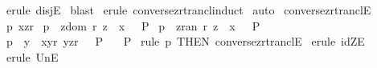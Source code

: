 \begin{isabellebody}
\ {\isacharparenleft}erule\ disjE{\isacharparenright}\isanewline
{}\isamarkupfalse%
\ blast{\isacharplus}\isanewline
{}\isamarkupfalse%
\ {\isacharparenleft}erule\ converse{\isacharunderscore}zrtrancl{\isacharunderscore}induct{\isacharparenright}\isanewline
{}\isamarkupfalse%
\ {\isacharparenleft}auto{\isacharparenright}\isanewline
{}\isamarkupfalse%
%
\endisatagproof
{\isafoldproof}%
%
\isadelimproof
\isanewline
%
\endisadelimproof
\isanewline
{}\isamarkupfalse%
\ converse{\isacharunderscore}zrtranclE{\isacharcolon}\isanewline
{}\ p{}{\isacharcolon}\ {\isachardoublequoteopen}{\isacharparenleft}x{\isacharcomma}z{\isacharparenright}{\isacharcolon}r{\isacharpercent}{\isacharasterisk}{\isachardoublequoteclose}\isanewline
{}\ p{}{\isacharcolon}\ {\isachardoublequoteopen}{\isacharbrackleft}{\isacharbar}\ z{\isacharcolon}{\isacharparenleft}dom\ r{\isacharparenright}{\isacharsemicolon}\ z\ {\isacharequal}\ x{\isacharbar}{\isacharbrackright}\ \ {\isacharequal}{\isacharequal}{\isachargreater}\ P{\isachardoublequoteclose}\isanewline
{}\ p{}{\isacharcolon}\ {\isachardoublequoteopen}{\isacharbrackleft}{\isacharbar}\ z{\isacharcolon}{\isacharparenleft}ran\ r{\isacharparenright}{\isacharsemicolon}\ z\ {\isacharequal}\ x{\isacharbar}{\isacharbrackright}\ \ {\isacharequal}{\isacharequal}{\isachargreater}\ P{\isachardoublequoteclose}\ \ \ \ \ \ \ \ \isanewline
{}\ p{}{\isacharcolon}\ \ {\isachardoublequoteopen}{\isacharbang}{\isacharbang}y{\isachardot}\ {\isacharbrackleft}{\isacharbar}\ {\isacharparenleft}x{\isacharcomma}y{\isacharparenright}{\isacharcolon}r{\isacharsemicolon}\ {\isacharparenleft}y{\isacharcomma}z{\isacharparenright}{\isacharcolon}r{\isacharpercent}{\isacharasterisk}\ {\isacharbar}{\isacharbrackright}\ {\isacharequal}{\isacharequal}{\isachargreater}\ P{\isachardoublequoteclose}\ \ \isanewline
{}\ {\isachardoublequoteopen}P{\isachardoublequoteclose}\isanewline
%
\isadelimproof
%
\endisadelimproof
%
\isatagproof
{}\isamarkupfalse%
\ {\isacharparenleft}rule\ p{}\ {\isacharbrackleft}THEN\ converse{\isacharunderscore}zrtranclE{}{\isacharbrackright}{\isacharparenright}\isanewline
{}\isamarkupfalse%
\ {\isacharparenleft}erule\ idZE{\isacharparenright}\isanewline
\ \isamarkupfalse%
\ {\isacharparenleft}erule\ UnE{\isacharparenright}\isanewline
{}\isamarkupfalse%

\end{isabellebody}
